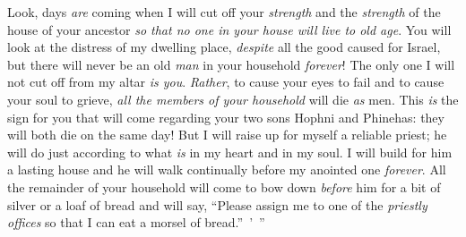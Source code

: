 \begin{biblechapter}
\verse Look, days \textit{are} coming when I will cut off your \textit{strength} and the \textit{strength} of the house of your ancestor \textit{so that no one in your house will live to old age}.
\verse You will look at the distress of my dwelling place, \textit{despite} all the good caused for Israel, but there will never be an old \textit{man} in your household \textit{forever}!
\verse The only one I will not cut off from my altar \textit{is you}. \textit{Rather}, to cause your eyes to fail and to cause your soul to grieve, \textit{all the members of your household} will die \textit{as} men.
\verse This \textit{is} the sign for you that will come regarding your two sons Hophni and Phinehas: they will both die on the same day!
\verse But I will raise up for myself a reliable priest; he will do just according to what \textit{is} in my heart and in my soul. I will build for him a lasting house and he will walk continually before my anointed one \textit{forever}.
\verse All the remainder of your household will come to bow down \textit{before} him for a bit of silver or a loaf of bread and will say, “Please assign me to one of the \textit{priestly offices} so that I can eat a morsel of bread.” ’ ”
\end{biblechapter}


